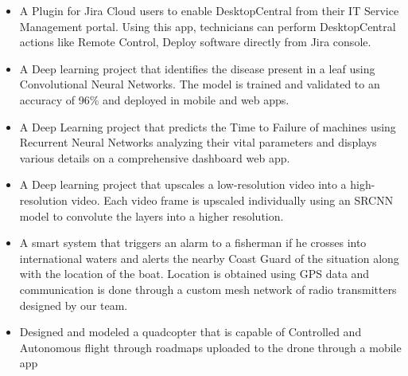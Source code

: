 \documentclass[10pt,a4paper,ragged2e]{altacv}
\begin{document}
\begin{fullwidth}

\begin{itemize}
\item A Plugin for Jira Cloud users to enable DesktopCentral from their IT Service Management portal. Using this app, technicians can perform DesktopCentral actions like Remote Control, Deploy software directly from Jira console.
\end{itemize}
\smallskip
\smallskip
{}
\begin{itemize}
\item A Deep learning project that identifies the disease present in a leaf using Convolutional Neural Networks. The model is trained and validated to an accuracy of 96\% and deployed in mobile and web apps.
\end{itemize}
\smallskip
\smallskip
{}
\begin{itemize}
\item A Deep Learning project that predicts the Time to Failure of machines using Recurrent Neural Networks analyzing their vital parameters and displays various details on a comprehensive dashboard web app.
\end{itemize}
\smallskip
\smallskip
{}
\begin{itemize}
\item A Deep learning project that upscales a low-resolution video into a high-resolution video. Each video frame is upscaled individually using an SRCNN model to convolute the layers into a higher resolution.
\end{itemize}
\smallskip
\smallskip
{}
\begin{itemize}
\item A smart system that triggers an alarm to a fisherman if he crosses into international waters and alerts the nearby Coast Guard of the situation along with the location of the boat. Location is obtained using GPS data and communication is done through a custom mesh network of radio transmitters designed by our team.
\end{itemize}
\smallskip
\smallskip
{}
\begin{itemize}
\item Designed and modeled a quadcopter that is capable of Controlled and Autonomous flight through roadmaps uploaded to the drone through a mobile app
\end{itemize}
\smallskip
\smallskip


\end{fullwidth}
\end{document}
